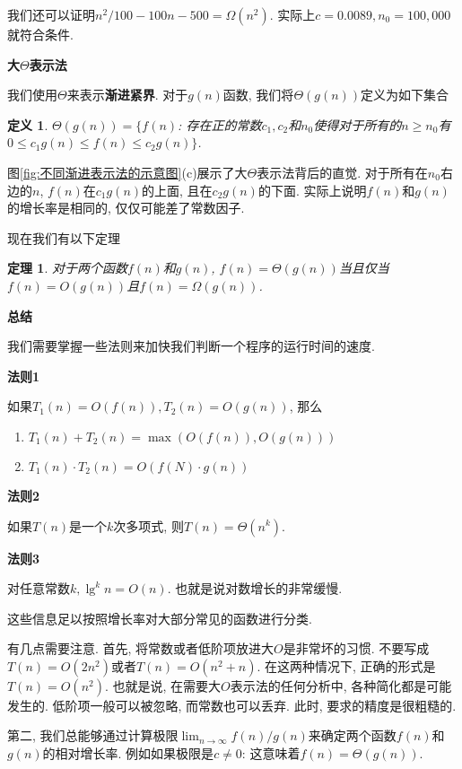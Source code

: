 \documentclass[oneside,10pt,fontset=none]{ctexbook}
\newtheorem{definition}{定义}
\numberwithin{definition}{chapter}
\newtheorem{theorem}{定理}
\numberwithin{theorem}{chapter}
\numberwithin{lemma}{chapter}
\begin{document}
我们还可以证明$n^2/100-100n-500=\Omega(n^2)$. 实际上$c=0.0089,n_0=100,000$就符合条件.

\textbf{大$\Theta$表示法}

我们使用$\Theta$来表示\textbf{渐进紧界}. 对于$g(n)$函数, 我们将$\Theta(g(n))$定义为如下集合

\begin{definition}
$\Theta(g(n))=\{f(n)$: 存在正的常数$c_1,c_2$和$n_0$使得对于所有的$n\geq n_0$有$0\leq c_1g(n)\leq f(n)\leq c_2g(n)\}$.
\end{definition}

图\ref{fig:不同渐进表示法的示意图}(c)展示了大$\Theta$表示法背后的直觉. 对于所有在$n_0$右边的$n$, $f(n)$在$c_1g(n)$的上面, 且在$c_2g(n)$的下面. 实际上说明$f(n)$和$g(n)$的增长率是相同的, 仅仅可能差了常数因子.

现在我们有以下定理

\begin{theorem}
对于两个函数$f(n)$和$g(n)$, $f(n)=\Theta(g(n))$当且仅当$f(n)=O(g(n))$且$f(n)=\Omega(g(n))$.
\end{theorem}

\textbf{总结}

我们需要掌握一些法则来加快我们判断一个程序的运行时间的速度.

\textbf{法则1}

如果$T_1(n)=O(f(n)), T_2(n)=O(g(n))$, 那么

\begin{enumerate}
    \item $T_1(n)+T_2(n)=\max(O(f(n)), O(g(n)))$
    \item $T_1(n) \cdot T_2(n) = O(f(N)\cdot g(n))$
\end{enumerate}

\textbf{法则2}

如果$T(n)$是一个$k$次多项式, 则$T(n)=\Theta(n^k)$.

\textbf{法则3}

对任意常数$k, \lg^kn=O(n)$. 也就是说对数增长的非常缓慢.

这些信息足以按照增长率对大部分常见的函数进行分类.

有几点需要注意. 首先, 将常数或者低阶项放进大$O$是非常坏的习惯. 不要写成$T(n)=O(2n^2)$或者$T(n)=O(n^2+n)$. 在这两种情况下, 正确的形式是$T(n)=O(n^2)$. 也就是说, 在需要大$O$表示法的任何分析中, 各种简化都是可能发生的. 低阶项一般可以被忽略, 而常数也可以丢弃. 此时, 要求的精度是很粗糙的.

第二, 我们总能够通过计算极限$\lim_{n\to\infty}f(n)/g(n)$来确定两个函数$f(n)$和$g(n)$的相对增长率. 例如如果极限是$c\neq 0$: 这意味着$f(n)=\Theta(g(n))$.
\end{document}

